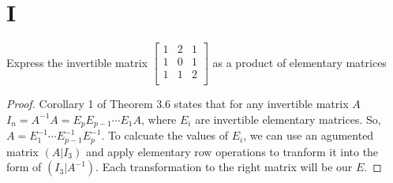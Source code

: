 \documentclass[11pt]{scrartcl}
\begin{document}
\section{I} 
Express the invertible matrix
$
\begin{bmatrix}
1 & 2 & 1\\
1 & 0 & 1 \\ 
1 & 1 & 2 \\ 
\end{bmatrix}
$
as a product of elementary matrices
\begin{proof}
Corollary 1 of Theorem 3.6 states that for any invertible matrix $A$\\
$I_n= A^{-1}A = E_p E_{p-1} \cdots E_1 A$, where $E_i$ are invertible elementary matrices. 
So, $A = E_1^{-1} \cdots E_{p-1}^{-1} E_p^{-1}$.
To calcuate the values of $E_i$, we can use an agumented matrix 
$(A|I_3)$ and apply elementary row operations to tranform it 
into the form of $(I_3|A^{-1})$. Each transformation to the right matrix will be our $E$. 


\end{proof}
\end{document}
